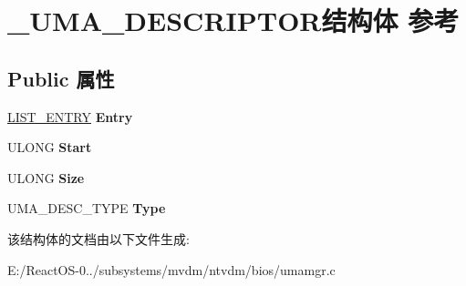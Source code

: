 \hypertarget{struct___u_m_a___d_e_s_c_r_i_p_t_o_r}{}\section{\+\_\+\+U\+M\+A\+\_\+\+D\+E\+S\+C\+R\+I\+P\+T\+O\+R结构体 参考}
\label{struct___u_m_a___d_e_s_c_r_i_p_t_o_r}
\subsection*{Public 属性}
\begin{DoxyCompactItemize}
\item 
\mbox{\label{struct___u_m_a___d_e_s_c_r_i_p_t_o_r_a7bedc65acefba878ba44fe78d35a8c53}} 
\hyperlink{struct___l_i_s_t___e_n_t_r_y}{L\+I\+S\+T\+\_\+\+E\+N\+T\+RY} {\bfseries Entry}
\item 
\mbox{\label{struct___u_m_a___d_e_s_c_r_i_p_t_o_r_abf00d55daba41f442b0e48ee9d7a370f}} 
U\+L\+O\+NG {\bfseries Start}
\item 
\mbox{\label{struct___u_m_a___d_e_s_c_r_i_p_t_o_r_ad997e3e92188d098847b854ce024a351}} 
U\+L\+O\+NG {\bfseries Size}
\item 
\mbox{\label{struct___u_m_a___d_e_s_c_r_i_p_t_o_r_a039d36786e5674e75df7495fddb2aa2c}} 
U\+M\+A\+\_\+\+D\+E\+S\+C\+\_\+\+T\+Y\+PE {\bfseries Type}
\end{DoxyCompactItemize}


该结构体的文档由以下文件生成\+:\begin{DoxyCompactItemize}
\item 
E\+:/\+React\+O\+S-\/0../subsystems/mvdm/ntvdm/bios/umamgr.\+c\end{DoxyCompactItemize}
